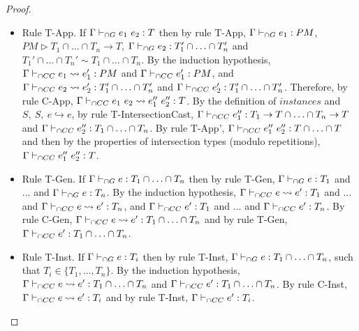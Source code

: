 \documentclass[a4paper]{article}
\begin{document}
\begin{proof}
\begin{itemize}
    \item Rule T-App.
    If $\Gamma \vdash_{\cap G} e_1\ e_2 : T$ then by rule T-App, $\Gamma \vdash_{\cap G} e_1 : PM$, $PM \rhd T_1 \cap \ldots \cap T_n \rightarrow T$, $\Gamma \vdash_{\cap G} e_2 : T_1' \cap \ldots \cap T_n'$ and $T_1' \cap \ldots \cap T_n' \sim T_1 \cap \ldots \cap T_n$.
    By the induction hypothesis, $\Gamma \vdash_{\cap CC} e_1 \leadsto e_1' : PM$ and $\Gamma \vdash_{\cap CC} e_1' : PM$, and $\Gamma \vdash_{\cap CC} e_2 \leadsto e_2' : T_1' \cap \ldots \cap T_n'$ and $\Gamma \vdash_{\cap CC} e_2' : T_1' \cap \ldots \cap T_n'$.
    Therefore, by rule C-App, $\Gamma \vdash_{\cap CC} e_1\ e_2 \leadsto e_1''\ e_2'' : T$.
    By the definition of $instances$ and $S,\ S,\ e \hookrightarrow e$, by rule T-IntersectionCast, $\Gamma \vdash_{\cap CC} e_1'' : T_1 \rightarrow T \cap \ldots \cap T_n \rightarrow T$ and $\Gamma \vdash_{\cap CC} e_2'' : T_1 \cap \ldots \cap T_n$.
    By rule T-App', $\Gamma \vdash_{\cap CC} e_1''\ e_2'' : T \cap \ldots \cap T$ and then by the properties of intersection types (modulo repetitions), $\Gamma \vdash_{\cap CC} e_1''\ e_2'' : T$.
    \item Rule T-Gen.
    If $\Gamma \vdash_{\cap G} e : T_1 \cap \ldots \cap T_n$ then by rule T-Gen, $\Gamma \vdash_{\cap G} e : T_1$ and ... and $\Gamma \vdash_{\cap G} e : T_n$.
    By the induction hypothesis, $\Gamma \vdash_{\cap CC} e \leadsto e' : T_1$ and ... and $\Gamma \vdash_{\cap CC} e \leadsto e' : T_n$, and $\Gamma \vdash_{\cap CC} e' : T_1$ and ... and $\Gamma \vdash_{\cap CC} e' : T_n$.
    By rule C-Gen, $\Gamma \vdash_{\cap CC} e \leadsto e' : T_1 \cap \ldots \cap T_n$ and by rule T-Gen, $\Gamma \vdash_{\cap CC} e' : T_1 \cap \ldots \cap T_n$.
    \item Rule T-Inst.
    If $\Gamma \vdash_{\cap G} e : T_i$ then by rule T-Inst, $\Gamma \vdash_{\cap G} e : T_1 \cap \ldots \cap T_n$, such that $T_i \in \{T_1, \ldots, T_n\}$.
    By the induction hypothesis, $\Gamma \vdash_{\cap CC} e \leadsto e' : T_1 \cap \ldots \cap T_n$ and $\Gamma \vdash_{\cap CC} e' : T_1 \cap \ldots \cap T_n$.
    By rule C-Inst, $\Gamma \vdash_{\cap CC} e \leadsto e' : T_i$ and by rule T-Inst, $\Gamma \vdash_{\cap CC} e' : T_i$.
\end{itemize}
\end{proof}
\end{document}
